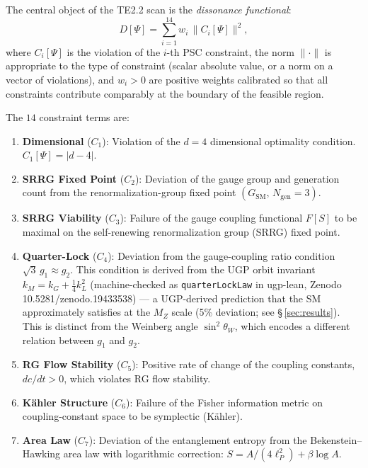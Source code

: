 \documentclass[11pt,twocolumn]{article}
\theoremstyle{remark}
\begin{document}
The central object of the TE2.2 scan is the
\emph{dissonance functional}:
\begin{equation}
  D[\Psi] = \sum_{i=1}^{14} w_i \,\|C_i[\Psi]\|^2,
  \label{eq:dissonance}
\end{equation}
where $C_i[\Psi]$ is the violation of the $i$-th PSC constraint, the
norm $\|\cdot\|$ is appropriate to the type of constraint
(scalar absolute value, or a norm on a vector of violations),
and $w_i>0$ are positive weights calibrated so that all
constraints contribute comparably at the boundary of the feasible
region.

The $14$ constraint terms are:
\begin{enumerate}
  \item \textbf{Dimensional} ($C_1$): Violation of the $d=4$
        dimensional optimality condition.
        $C_1[\Psi]=|d-4|$.
  \item \textbf{SRRG Fixed Point} ($C_2$): Deviation of the gauge group
        and generation count from the renormalization-group fixed point
        $(G_{\mathrm{SM}},\, N_{\mathrm{gen}}=3)$.
  \item \textbf{SRRG Viability} ($C_3$): Failure of the gauge
        coupling functional $F[S]$ to be maximal on the self-renewing
        renormalization group (SRRG) fixed point.
  \item \textbf{Quarter-Lock} ($C_4$): Deviation from the
        gauge-coupling ratio condition $\sqrt{3}\,g_1\approx g_2$.
        This condition is derived from the UGP orbit invariant
        $k_M=k_G+\tfrac{1}{4}k_L^2$ (machine-checked as
        \texttt{quarterLockLaw} in ugp-lean,
        Zenodo 10.5281/zenodo.19433538) — a UGP-derived prediction
        that the SM approximately satisfies at the $M_Z$ scale (5\%
        deviation; see \S\,\ref{sec:results}). This is distinct from
        the Weinberg angle $\sin^2\theta_W$, which encodes a different
        relation between $g_1$ and $g_2$.
  \item \textbf{RG Flow Stability} ($C_5$): Positive rate of change
        of the coupling constants, $dc/dt > 0$, which violates
        RG flow stability.
  \item \textbf{K\"{a}hler Structure} ($C_6$): Failure of the
        Fisher information metric on coupling-constant space to be
        symplectic (K\"{a}hler).
  \item \textbf{Area Law} ($C_7$): Deviation of the entanglement
        entropy from the Bekenstein--Hawking area law with
        logarithmic correction:
        $S=A/(4\ell_P^2)+\beta\log A$.

\end{enumerate}
\end{document}
